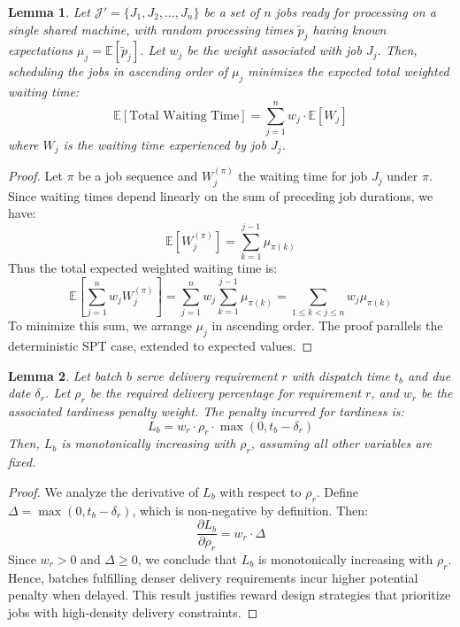 \documentclass{article}
\newtheorem{lemma}{Lemma}
\begin{document}
\begin{lemma}
Let $\mathcal{J}' = \{J_1, J_2, \dots, J_n\}$ be a set of $n$ jobs ready for processing on a single shared machine, with random processing times $\tilde{p}_j$ having known expectations $\mu_j = \mathbb{E}[\tilde{p}_j]$. Let $w_j$ be the weight associated with job $J_j$. Then, scheduling the jobs in ascending order of $\mu_j$ minimizes the expected total weighted waiting time:
\[
\mathbb{E}\left[\text{Total Waiting Time}\right] = \sum_{j=1}^n w_j \cdot \mathbb{E}[W_j]
\]
where $W_j$ is the waiting time experienced by job $J_j$.
\end{lemma}

\begin{proof}
Let $\pi$ be a job sequence and $W_j^{(\pi)}$ the waiting time for job $J_j$ under $\pi$. Since waiting times depend linearly on the sum of preceding job durations, we have:
\[
\mathbb{E}[W_j^{(\pi)}] = \sum_{k=1}^{j-1} \mu_{\pi(k)}
\]
Thus the total expected weighted waiting time is:
\[
\mathbb{E}\left[\sum_{j=1}^n w_j W_j^{(\pi)}\right] = \sum_{j=1}^n w_j \sum_{k=1}^{j-1} \mu_{\pi(k)} = \sum_{1 \leq k < j \leq n} w_j \mu_{\pi(k)}
\]
To minimize this sum, we arrange $\mu_j$ in ascending order. The proof parallels the deterministic SPT case, extended to expected values.
\end{proof}

\begin{lemma}
Let batch $b$ serve delivery requirement $r$ with dispatch time $t_b$ and due date $\delta_r$. Let $\rho_r$ be the required delivery percentage for requirement $r$, and $w_r$ be the associated tardiness penalty weight. The penalty incurred for tardiness is:
\[
L_b = w_r \cdot \rho_r \cdot \max(0, t_b - \delta_r)
\]
Then, $L_b$ is monotonically increasing with $\rho_r$, assuming all other variables are fixed.
\end{lemma}

\begin{proof}
We analyze the derivative of $L_b$ with respect to $\rho_r$. Define $\Delta = \max(0, t_b - \delta_r)$, which is non-negative by definition. Then:
\[
\frac{\partial L_b}{\partial \rho_r} = w_r \cdot \Delta
\]
Since $w_r > 0$ and $\Delta \geq 0$, we conclude that $L_b$ is monotonically increasing with $\rho_r$. Hence, batches fulfilling denser delivery requirements incur higher potential penalty when delayed. This result justifies reward design strategies that prioritize jobs with high-density delivery constraints.
\end{proof}
\end{document}

